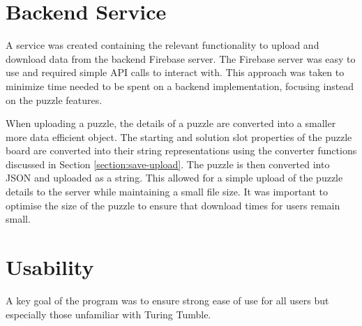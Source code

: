 \documentclass{l4proj}
\begin{document}
\section{Backend Service}
A service was created containing the relevant functionality to upload and download data from the backend Firebase server. The Firebase server was easy to use and required simple API calls to interact with. This approach was taken to minimize time needed to be spent on a backend implementation, focusing instead on the puzzle features. 


When uploading a puzzle, the details of a puzzle are converted into a smaller more data efficient object. The starting and solution slot properties of the puzzle board are converted into their string representations using the converter functions discussed in Section \ref{section:save-upload}. The puzzle is then converted into JSON and uploaded as a string. This allowed for a simple upload of the puzzle details to the server while maintaining a small file size. It was important to optimise the size of the puzzle to ensure that download times for users remain small. 


\section{Usability}
A key goal of the program was to ensure strong ease of use for all users but especially those unfamiliar with Turing Tumble. 
\end{document}
